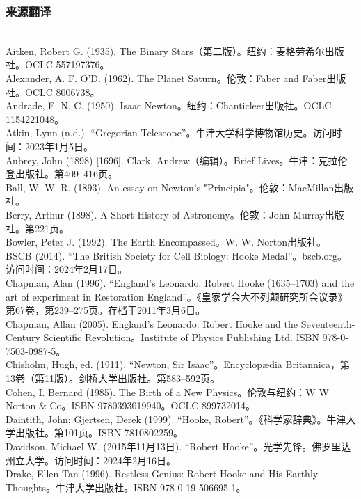 \subsubsection{来源翻译}\\
Aitken, Robert G. (1935). The Binary Stars（第二版）。纽约：麦格劳希尔出版社。OCLC 557197376。\\
Alexander, A. F. O'D. (1962). The Planet Saturn。伦敦：Faber and Faber出版社。OCLC 8006738。\\
Andrade, E. N. C. (1950). Isaac Newton。纽约：Chanticleer出版社。OCLC 1154221048。\\
Atkin, Lynn (n.d.). “Gregorian Telescope”。牛津大学科学博物馆历史。访问时间：2023年1月5日。\\  
Aubrey, John (1898) [1696]. Clark, Andrew（编辑）。Brief Lives。牛津：克拉伦登出版社。第409–416页。\\ 
Ball, W. W. R. (1893). An essay on Newton's "Principia"。伦敦：MacMillan出版社。\\
Berry, Arthur (1898). A Short History of Astronomy。伦敦：John Murray出版社。第221页。\\
Bowler, Peter J. (1992). The Earth Encompassed。W. W. Norton出版社。\\  
BSCB (2014). “The British Society for Cell Biology: Hooke Medal”。bscb.org。访问时间：2024年2月17日。\\
Chapman, Alan (1996). “England's Leonardo: Robert Hooke (1635–1703) and the art of experiment in Restoration England”。《皇家学会大不列颠研究所会议录》第67卷，第239–275页。存档于2011年3月6日。\\
Chapman, Allan (2005). England's Leonardo: Robert Hooke and the Seventeenth-Century Scientific Revolution。Institute of Physics Publishing Ltd. ISBN 978-0-7503-0987-5。\\
Chisholm, Hugh, ed. (1911). “Newton, Sir Isaac”。Encyclopædia Britannica，第13卷（第11版）。剑桥大学出版社。第583–592页。\\
Cohen, I. Bernard (1985). The Birth of a New Physics。伦敦与纽约：W W Norton & Co。ISBN 9780393019940。OCLC 899732014。\\
Daintith, John; Gjertsen, Derek (1999). “Hooke, Robert”。《科学家辞典》。牛津大学出版社。第101页。ISBN 7810802259。\\
Davidson, Michael W. (2015年11月13日). “Robert Hooke”。光学先锋。佛罗里达州立大学。访问时间：2024年2月16日。\\
Drake, Ellen Tan (1996). Restless Genius: Robert Hooke and His Earthly Thoughts。牛津大学出版社。ISBN 978-0-19-506695-1。\\
